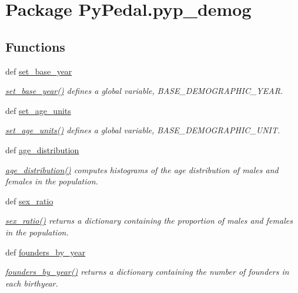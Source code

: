 \hypertarget{namespacePyPedal_1_1pyp__demog}{
\section{Package Py\-Pedal.pyp\_\-demog}
\label{namespacePyPedal_1_1pyp__demog}
}


\subsection*{Functions}
\begin{CompactItemize}
\item 
def \hyperlink{namespacePyPedal_1_1pyp__demog_22e55927dbf33815e5692914eb47c24b}{set\_\-base\_\-year}
\begin{CompactList}\small\item\em \hyperlink{namespacePyPedal_1_1pyp__demog_22e55927dbf33815e5692914eb47c24b}{set\_\-base\_\-year()} defines a global variable, BASE\_\-DEMOGRAPHIC\_\-YEAR. \item\end{CompactList}\item 
def \hyperlink{namespacePyPedal_1_1pyp__demog_6ccb10175c232e1f937d6b2c246de9a5}{set\_\-age\_\-units}
\begin{CompactList}\small\item\em \hyperlink{namespacePyPedal_1_1pyp__demog_6ccb10175c232e1f937d6b2c246de9a5}{set\_\-age\_\-units()} defines a global variable, BASE\_\-DEMOGRAPHIC\_\-UNIT. \item\end{CompactList}\item 
def \hyperlink{namespacePyPedal_1_1pyp__demog_7747d6a55a36517b83314e2637f5f9cd}{age\_\-distribution}
\begin{CompactList}\small\item\em \hyperlink{namespacePyPedal_1_1pyp__demog_7747d6a55a36517b83314e2637f5f9cd}{age\_\-distribution()} computes histograms of the age distribution of males and females in the population. \item\end{CompactList}\item 
def \hyperlink{namespacePyPedal_1_1pyp__demog_f4d5903dfa9782134c42fde487037ddc}{sex\_\-ratio}
\begin{CompactList}\small\item\em \hyperlink{namespacePyPedal_1_1pyp__demog_f4d5903dfa9782134c42fde487037ddc}{sex\_\-ratio()} returns a dictionary containing the proportion of males and females in the population. \item\end{CompactList}\item 
def \hyperlink{namespacePyPedal_1_1pyp__demog_b24de2bd6acca4c7b1f9a3a0fb7aaf21}{founders\_\-by\_\-year}
\begin{CompactList}\small\item\em \hyperlink{namespacePyPedal_1_1pyp__demog_b24de2bd6acca4c7b1f9a3a0fb7aaf21}{founders\_\-by\_\-year()} returns a dictionary containing the number of founders in each birthyear. \item\end{CompactList}\end{CompactItemize}



